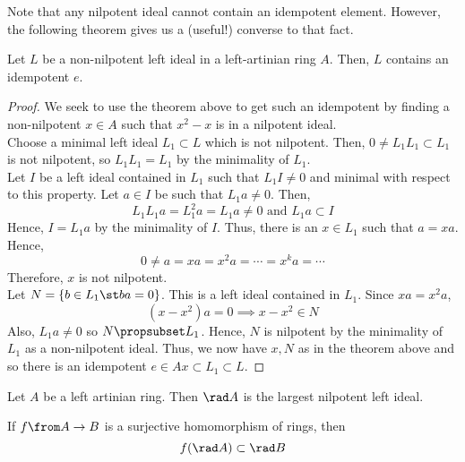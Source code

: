 \documentclass[11pt,leqno,oneside]{amsbook}
\numberwithin{thm}{section}
\begin{document}
\begin{rmk}
  Note that any nilpotent ideal cannot contain an idempotent
  element. However, the following theorem gives us a (useful!)
  converse to that fact.
\end{rmk}
\begin{thm}
  Let \(L\) be a non-nilpotent left ideal in a left-artinian ring
  \(A\). Then, \(L\) contains an idempotent \(e\).
\end{thm}
\begin{proof}
  We seek to use the theorem above to get such an idempotent by
  finding a non-nilpotent \(x \in A\) such that \(x^2-x\) is in a
  nilpotent ideal. \\

  Choose a minimal left ideal \(L_1 \subset L\) which is not
  nilpotent. Then, \(0 \neq L_1 L_1 \subset L_1\) is not nilpotent, so
  \(L_1 L_1 = L_1\) by the minimality of \(L_1\). \\

  Let \(I\) be a left ideal contained in \(L_1\) such that \(L_1 I
  \neq 0\) and minimal with respect to this property. Let \(a \in I\)
  be such that \(L_1 a \neq 0\). Then, \[
    L_1 L_1 a = L_1^2 a = L_1 a \neq 0 \text{ and } L_1 a \subset I
  \]
  Hence, \(I = L_1 a\) by the minimality of \(I\). Thus, there is an
  \(x \in L_1\) such that \(a=xa\). Hence, \[
    0 \neq a = xa = x^2 a = \cdots = x^k a = \cdots
  \]
  Therefore, \(x\) is not nilpotent. \\

  Let \(N = \{b \in L_1 \st ba = 0\}\). This is a left ideal contained
  in
  \(L_1\). Since \(xa = x^2 a\), \[
    (x-x^2)a = 0 \implies x-x^2 \in N
  \]
  Also, \(L_1 a \neq 0\) so \(N \propsubset L_1\). Hence, \(N\) is
  nilpotent by the minimality of \(L_1\) as a non-nilpotent
  ideal. Thus, we now have \(x,N\) as in the theorem above and so
  there is an idempotent \(e \in Ax \subset L_1 \subset L\).
\end{proof}
\begin{thm}
  Let \(A\) be a left artinian ring. Then \(\rad A\) is the largest
  nilpotent left ideal.
\end{thm}
\begin{prop}
  If \(f \from A \to B\) is a surjective homomorphism of rings,
  then \[
    f(\rad A) \subset \rad B
  \]
\end{prop}
\end{document}
